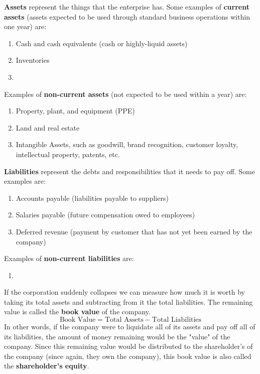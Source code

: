\documentclass{article}
\begin{document}
    \begin{definition}[Assets]
      \textbf{Assets} represent the things that the enterprise has. Some examples of \textbf{current assets} (assets expected to be used through standard business operations within one year) are: 
      \begin{enumerate}
        \item Cash and cash equivalents (cash or highly-liquid assets)
        \item Inventories
        \item
      \end{enumerate}
      Examples of \textbf{non-current assets} (not expected to be used within a year) are: 
      \begin{enumerate}
        \item Property, plant, and equipment (PPE)
        \item Land and real estate
        \item Intangible Assets, such as goodwill, brand recognition, customer loyalty, intellectual property, patents, etc. 
      \end{enumerate}
    \end{definition}

    \begin{definition}[Liabilities]
      \textbf{Liabilities} represent the debts and responsibilities that it needs to pay off. Some examples are: 
      \begin{enumerate}
        \item Accounts payable (liabilities payable to suppliers) 
        \item Salaries payable (future compensation owed to employees)
        \item Deferred revenue (payment by customer that has not yet been earned by the company) 
      \end{enumerate}
      Examples of \textbf{non-current liabilities} are: 
      \begin{enumerate}
          \item 
      \end{enumerate}
    \end{definition}

    \begin{definition}
      If the corporation suddenly collapses we can measure how much it is worth by taking its total assets and subtracting from it the total liabilities. The remaining value is called the \textbf{book value} of the company. 
      \[\text{Book Value} = \text{Total Assets} - \text{Total Liabilities}\]
      In other words, if the company were to liquidate all of its assets and pay off all of its liabilities, the amount of money remaining would be the "value" of the company. Since this remaining value would be distributed to the shareholder's of the company (since again, they own the company), this book value is also called the \textbf{shareholder's equity}. 
    \end{definition}
\end{document}
